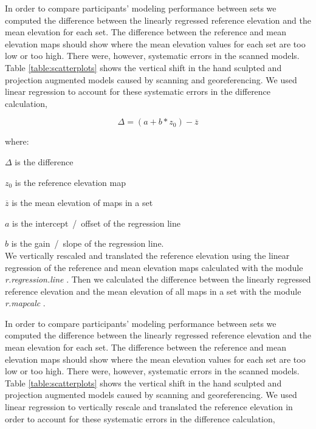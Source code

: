 \documentclass[prodmode,acmtochi]{acmsmall} %
\begin{document}



In order to compare participants' modeling performance between sets 
we computed the difference 
between the linearly regressed reference elevation and 
the mean elevation for each set.
%
The difference between the reference and mean elevation maps should show
where the mean elevation values for each set are too low or too high. 
%
There were, however, systematic errors in the scanned models.
%
Table \ref{table:scatterplots} shows the vertical shift 
in the hand sculpted and projection augmented models 
caused by scanning and georeferencing.
%
We used linear regression  
to account for these systematic errors 
in the difference calculation, 

\begin{equation}
\label{eq:regressed_difference}
\Delta = (a + b * z_0) - \overline{z}
\end{equation}

where:

\hspace*{1em} $\Delta$ is the difference

\hspace*{1em} $z_0$ is the reference elevation map

\hspace*{1em} $\overline{z}$ is the mean elevation of maps in a set

\hspace*{1em} $a$ is the intercept~/~offset of the regression line

\hspace*{1em} $b$ is the gain~/~slope of the regression line.\\

We vertically rescaled and translated the reference elevation 
using the linear regression of the reference and mean elevation maps
calculated with the module \textit{r.regression.line} \cite{r.regression.line}.
%
Then we calculated the difference between 
the linearly regressed reference elevation 
and the mean elevation of all maps in a set
with the module \textit{r.mapcalc} \cite{r.mapcalc}. 

\pagebreak

In order to compare participants' modeling performance between sets 
we computed the difference 
between the linearly regressed reference elevation and 
the mean elevation for each set.
%
The difference between the reference and mean elevation maps should show
where the mean elevation values for each set are too low or too high. 
%
There were, however, systematic errors in the scanned models.
%
Table \ref{table:scatterplots} shows the vertical shift 
in the hand sculpted and projection augmented models 
caused by scanning and georeferencing.
%
We used linear regression 
to vertically rescale and translated the reference elevation 
in order to account for these systematic errors
in the difference calculation,
\end{document}
